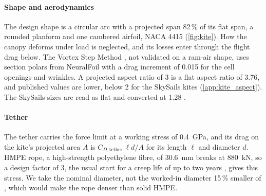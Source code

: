 \paragraph{Shape and aerodynamics} The design shape is a circular arc with a projected span 82\,\% of its flat span, a rounded planform and one cambered airfoil, NACA 4415 (\cref{fig:kite}). How the canopy deforms under load is neglected, and its losses enter through the flight drag below. The Vortex Step Method \citep{cayon2023}, not validated on a ram-air shape, uses section polars from NeuralFoil \citep{sharpe2025} with a drag increment of 0.015 for the cell openings and wrinkles. A projected aspect ratio of 3 is a flat aspect ratio of 3.76, and published values are lower, below 2 for the SkySails kites (\cref{app:kite_aspect}).  The SkySails sizes are read as flat and converted at 1.28 \citep{folkersma2020}.

\paragraph{Tether} The tether carries the force limit at a working stress of \SI{0.4}{GPa}, and its drag on the kite's projected area $A$ is $C_{D,\mathrm{tether}}\,\ell d/A$ for its length $\ell$ and diameter $d$. HMPE rope, a high-strength polyethylene fibre, of \SI{30.6}{mm} breaks at \SI{880}{kN}, so a design factor of 3, the usual start for a creep life of up to two years \citep{bosman2013}, gives this stress. We take the nominal diameter, not the worked-in diameter 15\,\% smaller of \citet{bosman2013}, which would make the rope denser than solid HMPE.


